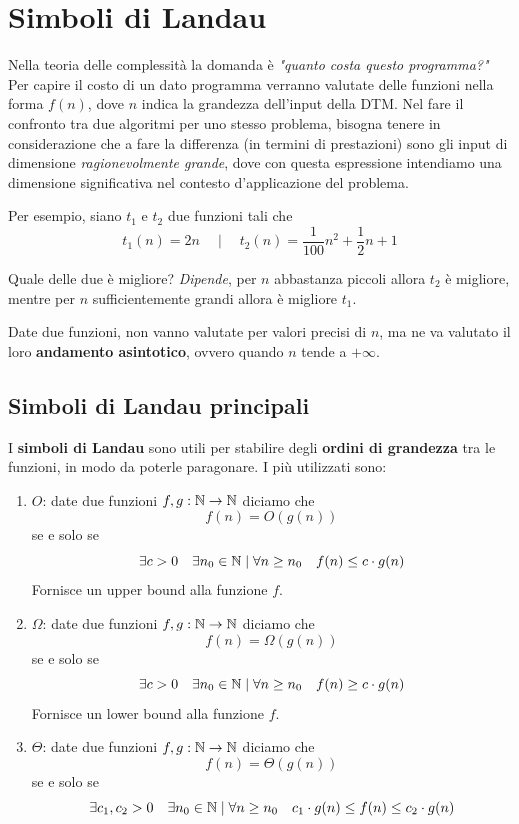 \section{Simboli di Landau}

Nella teoria delle complessità la domanda è \textit{"quanto costa questo programma?"} Per capire il costo di un dato programma verranno valutate delle funzioni nella forma $f(n)$, dove $n$ indica la grandezza dell'input della DTM. Nel fare il confronto tra due algoritmi per uno stesso problema, bisogna tenere in considerazione che a fare la differenza (in termini di prestazioni) sono gli input di dimensione \textit{ragionevolmente grande}, dove con questa espressione intendiamo una dimensione significativa nel contesto d'applicazione del problema.

Per esempio, siano $t_1$ e $t_2$ due funzioni tali che
$$ t_1 (n) = 2n \quad \mid \quad t_2 (n) = \frac{1}{100} n^2 + \frac{1}{2}n + 1 $$

Quale delle due è migliore? \textit{Dipende}, per $n$ abbastanza piccoli allora $t_2$ è migliore, mentre per $n$ sufficientemente grandi allora è migliore $t_1$.

Date due funzioni, non vanno valutate per valori precisi di $n$, ma ne va valutato il loro \textbf{andamento asintotico}, ovvero quando $n$ tende a $+ \infty$.

\subsection{Simboli di Landau principali}

I \textbf{simboli di Landau} sono utili per stabilire degli \textbf{ordini di grandezza} tra le funzioni, in modo da poterle paragonare. I più utilizzati sono:
\begin{enumerate}
	\item $O$: date due funzioni $f,g: \mathbb{N} \rightarrow \mathbb{N}$ diciamo che 
	$$ f(n) = O(g(n)) $$
	se e solo se
	$$ \exists c > 0 \quad \exists n_0 \in \mathbb{N} \mid \forall n \geq n_0 \quad f(n) \leq c \cdot g (n) $$
	Fornisce un upper bound alla funzione $f$.
	
	\item $\Omega$: date due funzioni $f,g: \mathbb{N} \rightarrow \mathbb{N}$ diciamo che 
	$$ f(n) = \Omega (g(n)) $$
	se e solo se
	$$ \exists c > 0 \quad \exists n_0 \in \mathbb{N} \mid \forall n \geq n_0 \quad f(n) \geq c \cdot g (n) $$
	Fornisce un lower bound alla funzione $f$.
	
	\item $\Theta$: date due funzioni $f,g : \mathbb{N} \rightarrow \mathbb{N}$ diciamo che
	$$ f(n) = \Theta (g(n)) $$
	se e solo se
	$$ \exists c_1, c_2 > 0 \quad \exists n_0 \in \mathbb{N} \mid \forall n \geq n_0 \quad c_1 \cdot g(n) \leq f(n) \leq c_2 \cdot g(n) $$
\end{enumerate}

